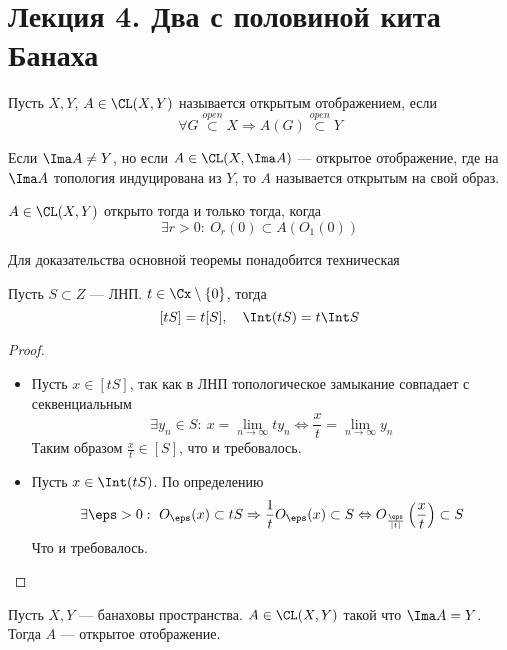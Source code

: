 \newpage
\section{Лекция 4. Два с половиной кита Банаха}
\begin{definition}
	Пусть $X,Y$, $A \in \CL(X,Y)$ называется открытым отображением, если
	$$
	\forall G \stackrel{open}{\subset} X \Rightarrow A(G) \stackrel{open}{\subset} Y
	$$
\end{definition}
\begin{remark}
	Если $\Ima A \neq Y$, но если $A \in \CL(X, \Ima A)$ --- открытое отображение, где на $\Ima A$ топология индуцирована из $Y$, то $A$ называется открытым на свой образ.
\end{remark}
\begin{claim}
	$A \in \CL(X,Y)$ открыто тогда и только тогда, когда
	$$
	\exists r > 0 : \ O_r(0) \subset A(O_1(0))
	$$
\end{claim}
Для доказательства основной теоремы понадобится техническая 
\begin{lemma}
	Пусть $S \subset Z$ --- ЛНП. $t \in \Cx \setminus \{0\}$, тогда
	$$
	[tS] = t[S], \quad \Int (tS) = t \Int S
	$$
\end{lemma}
\begin{proof}
	\hfill
\begin{itemize}
	\item 	Пусть $x \in [tS]$, так как в ЛНП топологическое замыкание совпадает с секвенциальным
	$$
	\exists y_n \in S: \ x = \lim\limits_{n \to \infty} t y_n  \Leftrightarrow \frac{x}{t} = \lim\limits_{n \to \infty} y_n
	$$
	Таким образом $\frac{x}{t}\in [S]$, что и требовалось.
	\item Пусть $ x \in \Int(tS)$. По определению
	$$
	\exists \eps > 0 : \ O_\eps(x) \subset t S \Rightarrow \frac{1}{t}O_\eps(x) \subset S \Leftrightarrow O_{\frac{\eps}{|t|}}\left(\frac{x}{t}\right) \subset S
	$$
	Что и требовалось.
\end{itemize}
\end{proof}
\begin{theorem}\label{th:banachopenmap}
	Пусть $X,Y$ --- банаховы пространства. $A \in \CL(X,Y)$ такой что $\Ima A = Y$. Тогда $A$ --- открытое отображение.
\end{theorem}
